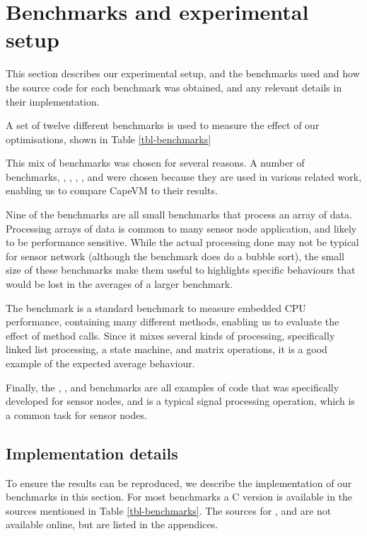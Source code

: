 \section{Benchmarks and experimental setup}
\label{sec-evaluation-benchmarks}


This section describes our experimental setup, and the benchmarks used and how the source code for each benchmark was obtained, and any relevant details in their implementation.

A set of twelve different benchmarks is used to measure the effect of our optimisations, shown in Table \ref{tbl-benchmarks}

This mix of benchmarks was chosen for several reasons. A number of benchmarks, , , , , and  were chosen because they are used in various related work, enabling us to compare CapeVM to their results.

Nine of the benchmarks are all small benchmarks that process an array of data. Processing arrays of data is common to many sensor node application, and likely to be performance sensitive. While the actual processing done may not be typical for sensor network (although the  benchmark does do a bubble sort), the small size of these benchmarks make them useful to highlights specific behaviours that would be lost in the averages of a larger benchmark.

The  benchmark is a standard benchmark to measure embedded CPU performance, containing many different methods, enabling us to evaluate the effect of method calls. Since it mixes several kinds of processing, specifically linked list processing, a state machine, and matrix operations, it is a good example of the expected average behaviour.

Finally, the , ,  and  benchmarks are all examples of code that was specifically developed for sensor nodes, and  is a typical signal processing operation, which is a common task for sensor nodes.


\subsection{Implementation details}
To ensure the results can be reproduced, we describe the implementation of our benchmarks in this section. For most benchmarks a C version is available in the sources mentioned in Table \ref{tbl-benchmarks}. The sources for ,  and  are not available online, but are listed in the appendices.

